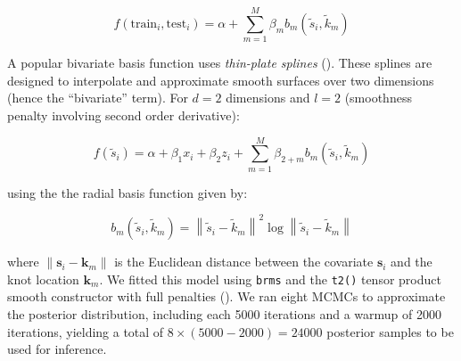 \documentclass[
  doc,
  floatsintext,
  longtable,
  a4paper,
  nolmodern,
  notxfonts,
  notimes,
  colorlinks=true,linkcolor=blue,citecolor=blue,urlcolor=blue]{apa7}
\begin{document}
\[
f \left(\text{train}_{i}, \text{test}_{i} \right) = \alpha + \sum_{m=1}^M \beta_{m} b_{m} \left(\tilde{s}_{i}, \tilde{k}_{m} \right)
\]

\setlength{\parindent}{0pt}
\setlength{\parskip}{6pt}

A popular bivariate basis function uses \emph{thin-plate splines}
(). These splines are designed to
interpolate and approximate smooth surfaces over two dimensions (hence
the ``bivariate'' term). For \(d=2\) dimensions and \(l=2\) (smoothness
penalty involving second order derivative):

\[
f \left(\tilde{s}_{i} \right) = \alpha + \beta_{1} x_{i} + \beta_{2} z_{i} +\sum_{m=1}^{M} \beta_{2+m} b_m\left(\tilde{s}_i, \tilde{k}_m\right)
\]

\setlength{\parindent}{0pt}
\setlength{\parskip}{6pt}

using the the radial basis function given by:

\[
b_m\left(\tilde{s}_i, \tilde{k}_m\right)=\left\|\tilde{s}_i-\tilde{k}_m\right\|^2 \log \left\|\tilde{s}_i-\tilde{k}_m\right\|
\]

\setlength{\parindent}{0pt}
\setlength{\parskip}{6pt}

where \(\left\|\mathbf{s}_i-\mathbf{k}_{m}\right\|\) is the Euclidean
distance between the covariate \(\mathbf{s}_{i}\) and the knot location
\(\mathbf{k}_{m}\). We fitted this model using \texttt{brms} and the
\texttt{t2()} tensor product smooth constructor with full penalties
(). We ran eight MCMCs to approximate the posterior distribution,
including each 5000 iterations and a warmup of 2000 iterations, yielding
a total of \(8 \times (5000-2000) = 24000\) posterior samples to be used
for inference.
\end{document}
